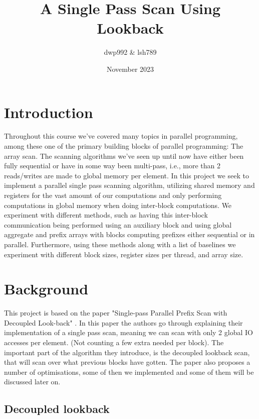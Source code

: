 \documentclass[twocolumn]{article}
\title{A Single Pass Scan Using Lookback}
\author{dwp992 \& lsh789}
\date{November 2023\vspace{2ex}}
\begin{document}
\maketitle
\thispagestyle{fancy}

\section{Introduction}
Throughout this course we've covered many topics in parallel programming, among these one of the primary building blocks of parallel programming: The array scan. The scanning algorithms we've seen up until now have either been fully sequential or have in some way been multi-pass, i.e., more than 2 reads/writes are made to global memory per element. In this project we seek to implement a parallel single pass scanning algorithm, utilizing shared memory and registers for the vast amount of our computations and only performing computations in global memory when doing inter-block computations. We experiment with different methods, such as having this inter-block communication being performed using an auxiliary block and using global aggregate and prefix arrays with blocks computing prefixes either sequential or in parallel. Furthermore, using these methods along with a list of baselines we experiment with different block sizes, register sizes per thread, and array size.

\section{Background}
\label{sec:background}

This project is based on the paper "Single-pass Parallel Prefix Scan with Decoupled Look-back" \cite{SPS_paper}. In this paper the authors go through explaining their implementation of a single pass scan, meaning we can scan with only 2 global IO accesses per element. (Not counting a few extra needed per block). The important part of the algorithm they introduce, is the decoupled lookback scan, that will scan over what previous blocks have gotten. The paper also proposes a number of optimisations, some of then we implemented and some of them will be discussed later on.

\subsection{Decoupled lookback}
\end{document}
